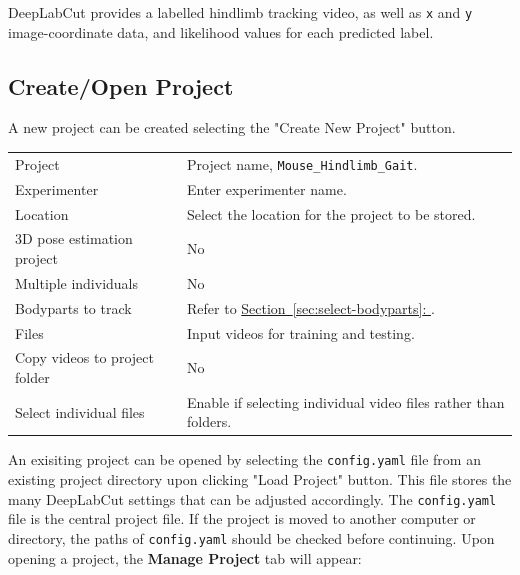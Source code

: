 \documentclass[11pt]{article}
\newcommand{\secref}[1]{\hyperref[#1]{Section~\ref*{#1}: \nameref*{#1}}}
\renewcommand{\[}{%
  \par\smallskip\noindent
  \begin{center}%
  \setlength{\fboxsep}{5pt}%
  \setlength{\fboxrule}{0.35pt}%
  \begin{lrbox}{\almaEquationBox}%
  $\displaystyle
}
\renewcommand{\]}{%
  $%
  \end{lrbox}%
  \fcolorbox{equationLine}{equationBack}{\usebox{\almaEquationBox}}%
  \end{center}%
  \smallskip\par
}
\begin{document}
\begin{tcolorbox}[
    figure callout,
    title=\textbf{DeepLabCut Workflow Overview}
]

\end{tcolorbox}
\noindent DeepLabCut provides a labelled hindlimb tracking video, as well as \texttt{x} and \texttt{y} image-coordinate data, and likelihood values for each predicted label. 

\subsection{Create/Open Project}

A new project can be created selecting the "Create New Project" button. 

\begin{tcolorbox}[
    software settings,
    title=\textbf{Create Project: Recommended Settings}
]
\begin{tabularx}{\linewidth}{KV}
Project & Project name, \texttt{Mouse\_Hindlimb\_Gait}. \\
Experimenter & Enter experimenter name. \\
Location & Select the location for the project to be stored. \\
3D pose estimation project & No\\
Multiple individuals & No\\
Bodyparts to track & Refer to \secref{sec:select-bodyparts}. \\
Files & Input videos for training and testing. \\
Copy videos to project folder & No \\
Select individual files & Enable if selecting individual video files rather than folders. \\
\end{tabularx}
\end{tcolorbox}
An exisiting project can be opened by selecting the \texttt{config.yaml} file from an existing project directory upon clicking "Load Project" button. This file stores the many DeepLabCut settings that can be adjusted accordingly. The \texttt{config.yaml} file is the central project file. If the project is moved to another computer or directory, the paths of \texttt{config.yaml} should be checked before continuing. Upon opening a project, the \textbf{Manage Project} tab will appear:
\end{document}
